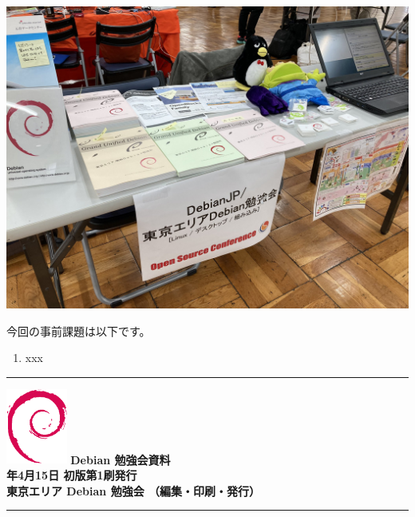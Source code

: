 \documentclass[mingoth,a4paper]{jsarticle}
\newcommand{\debmtgyear}{2023}
\newcommand{\debmtgmonth}{4}
\newcommand{\debmtgdate}{15}
\begin{document}
\begin{center}
  \includegraphics[width=0.30\hsize]{image202304/osc2023spring-booth.jpg}
\end{center}



今回の事前課題は以下です。

\begin{enumerate}
\item xxx
\end{enumerate}


\begin{multicols}{2}
{\small

}
\end{multicols}

%
%
%
%


      
%

\mbox{}\newpage
\mbox{}\newpage
\mbox{}\newpage

\vspace*{15cm}
\hrule
\vspace{2mm}
\includegraphics[width=2cm]{image-assets/openlogo-nd.eps}
\noindent \Large \bf Debian 勉強会資料\\
\noindent \normalfont \debmtgyear{}年\debmtgmonth{}月\debmtgdate{}日 \hspace{5mm}  初版第1刷発行\\
\noindent \normalfont 東京エリア Debian 勉強会 （編集・印刷・発行）\\
\hrule
\end{document}
